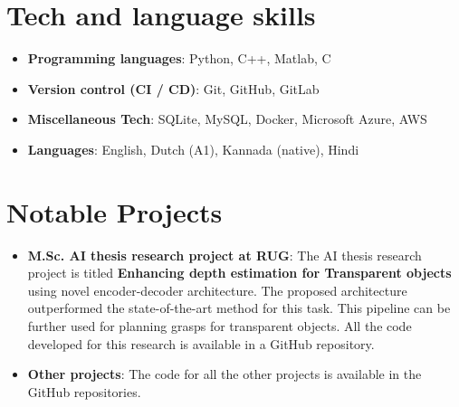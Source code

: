 \documentclass[letterpaper,11pt]{article}
\newcommand{\resumeItem}[2]{
    \item\small{
        \textbf{#1}{: #2 \vspace{-2pt}}
    }
}
\newcommand{\resumeSubItem}[2]{\resumeItem{#1}{#2}\vspace{-4pt}}
\newcommand{\resumeSubHeadingListStart}{\begin{itemize}[leftmargin=*]}
\newcommand{\resumeSubHeadingListEnd}{\end{itemize}}
\begin{document}

\section{Tech and language skills}
    \resumeSubHeadingListStart
        \resumeSubItem{Programming languages}
        {Python, C++, Matlab, C}
        \resumeSubItem{Version control (CI / CD)}
        {Git, GitHub, GitLab}
        \resumeSubItem{Miscellaneous Tech}
        {SQLite, MySQL, Docker, Microsoft Azure, AWS}
        \resumeSubItem{Languages}
        {English, Dutch (A1), Kannada (native), Hindi}
    \resumeSubHeadingListEnd

\section{Notable Projects}
    \resumeSubHeadingListStart
        \resumeSubItem{M.Sc. AI thesis research project at RUG}
        {The AI thesis research project is titled \textbf{Enhancing depth estimation for Transparent objects} using novel encoder-decoder architecture. The proposed architecture outperformed the state-of-the-art method for this task. This pipeline can be further used for planning grasps for transparent objects. All the code developed for this research is available in a GitHub repository.}
        \resumeSubItem{Other projects}
        {The code for all the other projects is available in the GitHub repositories.}
    \resumeSubHeadingListEnd
        
\end{document}
